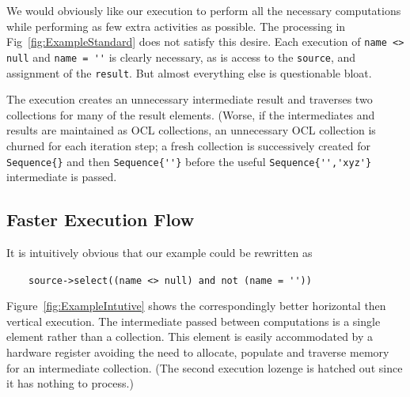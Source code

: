 \documentclass[
]{ceurart}
\begin{document}
We would obviously like our execution to perform all the necessary computations while performing as few extra activities as possible. The processing in Fig~\ref{fig:ExampleStandard} does not satisfy this desire. Each execution of \verb!name <> null! and \verb!name = ''! is clearly necessary, as is access to the \verb!source!, and assignment of the \verb!result!. But almost everything else is questionable bloat.

The execution creates an unnecessary intermediate result and traverses two collections for many of the result elements. (Worse, if the intermediates and results are maintained as OCL collections, an unnecessary OCL collection is churned for each iteration step; a fresh collection is successively created for  \verb!Sequence{}! and then \verb!Sequence{''}! before the useful \verb!Sequence{'','xyz'}! intermediate is passed.

\subsection{Faster Execution Flow}

It is intuitively obvious that our example could be rewritten as

\begin{description}[itemsep=-0.2cm]\small
\item ~~~~\verb!source->select((name <> null) and not (name = ''))!
\end{description}

Figure~\ref{fig:ExampleIntutive} shows the correspondingly better horizontal then vertical execution. The intermediate passed between computations is a single element rather than a collection. This element is easily accommodated by a hardware register avoiding the need to allocate, populate and traverse memory for an intermediate collection. (The second execution lozenge is hatched out since it has nothing to process.)
\end{document}
